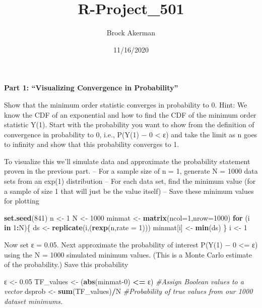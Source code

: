 \documentclass[
]{article}
\title{R-Project\_501}
\author{Brock Akerman}
\date{11/16/2020}
\newenvironment{Shaded}{\begin{snugshade}}{\end{snugshade}}
\newcommand{\CommentTok}[1]{\textcolor[rgb]{0.56,0.35,0.01}{\textit{#1}}}
\newcommand{\ControlFlowTok}[1]{\textcolor[rgb]{0.13,0.29,0.53}{\textbf{#1}}}
\newcommand{\DataTypeTok}[1]{\textcolor[rgb]{0.13,0.29,0.53}{#1}}
\newcommand{\DecValTok}[1]{\textcolor[rgb]{0.00,0.00,0.81}{#1}}
\newcommand{\FloatTok}[1]{\textcolor[rgb]{0.00,0.00,0.81}{#1}}
\newcommand{\KeywordTok}[1]{\textcolor[rgb]{0.13,0.29,0.53}{\textbf{#1}}}
\newcommand{\NormalTok}[1]{#1}
\newcommand{\OperatorTok}[1]{\textcolor[rgb]{0.81,0.36,0.00}{\textbf{#1}}}
\newcommand{\StringTok}[1]{\textcolor[rgb]{0.31,0.60,0.02}{#1}}
\begin{document}
\maketitle

\textbf{Part 1: ``Visualizing Convergence in Probability''}

Show that the minimum order statistic converges in probability to 0.
Hint: We know the CDF of an exponential and how to find the CDF of the
minimum order statistic Y(1). Start with the probability you want to
show from the definition of convergence in probability to 0, i.e.,
P(\textbar Y(1) − 0\textbar{} \textless{} ε) and take the limit as n
goes to infinity and show that this probability converges to 1.

To visualize this we'll simulate data and approximate the probability
statement proven in the previous part. -- For a sample size of n = 1,
generate N = 1000 data sets from an exp(1) distribution -- For each data
set, find the minimum value (for a sample of size 1 that will just be
the value itself) -- Save these minimum values for plotting

\begin{Shaded}
\begin{Highlighting}[]
\KeywordTok{set.seed}\NormalTok{(}\DecValTok{841}\NormalTok{)}
\NormalTok{n <-}\StringTok{ }\DecValTok{1}
\NormalTok{N <-}\StringTok{ }\DecValTok{1000}
\NormalTok{minmat <-}\StringTok{ }\KeywordTok{matrix}\NormalTok{(}\DataTypeTok{ncol=}\DecValTok{1}\NormalTok{,}\DataTypeTok{nrow=}\DecValTok{1000}\NormalTok{)}
\ControlFlowTok{for}\NormalTok{ (i }\ControlFlowTok{in} \DecValTok{1}\OperatorTok{:}\NormalTok{N)\{}
\NormalTok{    ds <-}\StringTok{ }\KeywordTok{replicate}\NormalTok{(i,(}\KeywordTok{rexp}\NormalTok{(n,}\DataTypeTok{rate =} \DecValTok{1}\NormalTok{)))}
\NormalTok{    minmat[i] <-}\StringTok{ }\KeywordTok{min}\NormalTok{(ds)}
\NormalTok{    \}}
\NormalTok{i <-}\StringTok{ }\DecValTok{1}
\end{Highlighting}
\end{Shaded}

Now set ε = 0.05. Next approximate the probability of interest
P(\textbar Y(1) − 0\textbar{} \textless= ε) using the N = 1000 simulated
minimum values. (This is a Monte Carlo estimate of the probability.)
Save this probability

\begin{Shaded}
\begin{Highlighting}[]
\NormalTok{ε <-}\StringTok{ }\FloatTok{0.05}
\NormalTok{TF_values <-}\StringTok{ }\NormalTok{(}\KeywordTok{abs}\NormalTok{(minmat}\DecValTok{-0}\NormalTok{) }\OperatorTok{<=}\StringTok{ }\NormalTok{ε) }\CommentTok{#Assign Boolean values to a vector}
\NormalTok{dsprob <-}\StringTok{ }\KeywordTok{sum}\NormalTok{(TF_values)}\OperatorTok{/}\NormalTok{N }\CommentTok{#Probability of true values from our 1000 dataset minimums. }
\end{Highlighting}
\end{Shaded}
\end{document}
